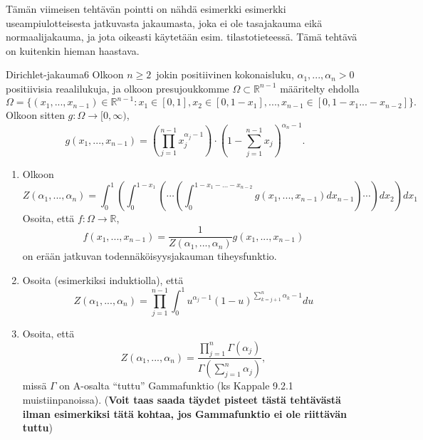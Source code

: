 \documentclass[11pt,a4paper]{amsart}
\newcommand{\R}{\mathbb{R}}
\newcommand{\1}{\mathbf{1}}
\begin{document}
Tämän viimeisen tehtävän pointti on nähdä esimerkki esimerkki useampiulotteisesta jatkuvasta jakaumasta, joka ei ole tasajakauma eikä normaalijakauma, ja jota oikeasti käytetään esim. tilastotieteessä. Tämä tehtävä on kuitenkin hieman haastava.

\begin{Exercises}{Dirichlet-jakauma}{6}
Olkoon $n\geq 2$ jokin positiivinen kokonaisluku, $\alpha_1,...,\alpha_n>0$ positiivisia reaalilukuja, ja olkoon presujoukkomme $\Omega\subset \R^{n-1}$ määritelty ehdolla 
\[
\Omega=\{(x_1,...,x_{n-1})\in \R^{n-1}: x_1\in [0,1], x_2\in [0,1-x_1], ...,x_{n-1}\in [0,1-x_1...-x_{n-2}]\}.
\]
Olkoon sitten $g:\Omega\to [0,\infty)$, 
\[
g(x_1,...,x_{n-1})=\left(\prod_{j=1}^{n-1}x_j^{\alpha_j-1}\right)\cdot \left(1-\sum_{j=1}^{n-1}x_j\right)^{\alpha_n-1}. 
\]
\begin{enumerate}
\item Olkoon 
\[
Z(\alpha_1,...,\alpha_n)=\int_0^1\left( \int_0^{1-x_1}\left(\cdots\left(\int_0^{1-x_1-...-x_{n-2}}g(x_1,...,x_{n-1})dx_{n-1}\right)\cdots \right)dx_2\right)dx_1 
\]
Osoita, että  $f:\Omega\to \R$, 
\[
f(x_1,...,x_{n-1})=\frac{1}{Z(\alpha_1,...,\alpha_n)}g(x_1,...,x_{n-1})
\]
on erään jatkuvan todennäköisyysjakauman tiheysfunktio.

\item Osoita (esimerkiksi induktiolla), että 
\[
Z(\alpha_1,...,\alpha_n)=\prod_{j=1}^{n-1} \int_0^1 u^{\alpha_j-1}(1-u)^{\sum_{k=j+1}^n \alpha_k-1}du
\]
\item Osoita, että
\[
Z(\alpha_1,...,\alpha_n)=\frac{\prod_{j=1}^n \Gamma(\alpha_j)}{\Gamma\left(\sum_{j=1}^n \alpha_j\right)},
\]
missä $\Gamma$ on A-osalta ``tuttu'' Gammafunktio (ks Kappale 9.2.1 muistiinpanoissa). ({\bf Voit taas saada täydet pisteet tästä tehtävästä ilman esimerkiksi tätä kohtaa, jos Gammafunktio ei ole riittävän tuttu})

\end{enumerate}
\end{Exercises}
\end{document}
